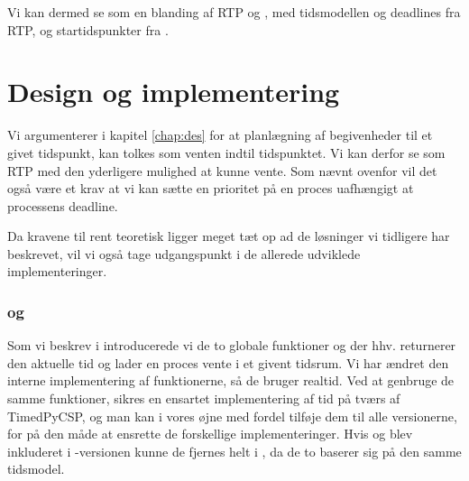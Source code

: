 Vi kan dermed se \is som en blanding af RTP og \des, med tidsmodellen og deadlines fra RTP, og startidspunkter fra \des. 



\section{Design og implementering} 
Vi argumenterer i kapitel \ref{chap:des} for at planlægning af begivenheder til et givet tidspunkt, kan tolkes som venten indtil tidspunktet. Vi kan derfor se \is som RTP med den yderligere mulighed at kunne vente. Som nævnt ovenfor vil det også være et krav at vi kan sætte en prioritet på en proces uafhængigt at processens deadline. 

Da kravene til \is rent teoretisk ligger meget tæt op ad de løsninger vi tidligere har beskrevet, vil vi også tage udgangspunkt i de allerede udviklede implementeringer. 


\subsubsection{ og }
Som vi beskrev i \des introducerede vi de to globale funktioner  og  der hhv. returnerer den aktuelle tid og lader en proces vente i et givent tidsrum. Vi har ændret den interne implementering af funktionerne, så de bruger realtid. Ved at genbruge de samme funktioner, sikres en ensartet implementering af tid på tværs af TimedPyCSP, og man kan i vores øjne med fordel tilføje dem til alle \pycsp versionerne, for på den måde at ensrette de forskellige implementeringer. Hvis  og  blev inkluderet i -versionen kunne de fjernes helt i \is, da de to baserer sig på den samme tidsmodel.

